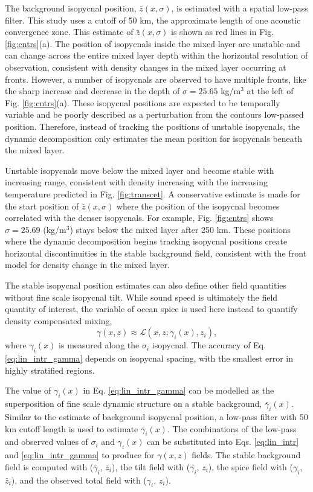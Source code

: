\documentclass[preprint,NumberedRefs]{JASA}
\begin{document}
The background isopycnal position, $\bar{z}(x, \sigma)$, is estimated with a spatial low-pass filter. This study uses a cutoff of 50 km, the approximate length of one acoustic convergence zone\cite{jensen2011computational}. This estimate of $\bar{z}(x, \sigma)$ is shown as red lines in Fig. \ref{fig:cntrs}(a). The position of isopycnals inside the mixed layer are unstable and can change across the entire mixed layer depth within the horizontal resolution of observation, consistent with density changes in the mixed layer occurring at fronts. However, a number of isopycnals are observed to have multiple fronts, like the sharp increase and decrease in the depth of $\sigma=25.65$ kg/m$^3$ at the left of Fig. \ref{fig:cntrs}(a). These isopycnal positions are expected to be temporally variable and be poorly described as a perturbation from the contours low-passed position. Therefore, instead of tracking the positions of unstable isopycnals, the dynamic decomposition only estimates the mean position for isopycnals beneath the mixed layer.

Unstable isopycnals move below the mixed layer and become stable with increasing range, consistent with density increasing with the increasing temperature predicted in Fig. \ref{fig:transcet}. A conservative estimate is made for the start position of $\bar{z}(x, \sigma)$ where the position of the isopycnal becomes correlated with the denser isopycnals. For example, Fig. \ref{fig:cntrs} shows $\sigma=25.69$ (kg/m$^3$) stays below the mixed layer after 250 km. These positions where the dynamic decomposition begins tracking isopycnal positions create horizontal discontinuities in the stable background field, consistent with the front model for density change in the mixed layer.

The stable isopycnal position estimates can also define other field quantities without fine scale isopycnal tilt. While sound speed is ultimately the field quantity of interest, the variable of ocean spice is used here instead to quantify density compensated mixing,
\begin{equation}
    \gamma(x, z)\approx\mathcal{L}(x, z; \gamma_i(x), z_i),
    \label{eq:lin_intr_gamma}
\end{equation}
where $\gamma_i(x)$ is measured along the $\sigma_i$ isopycnal. The accuracy of Eq. \eqref{eq:lin_intr_gamma} depends on isopycnal spacing, with the smallest error in highly stratified regions.

The value of $\gamma_i(x)$ in Eq. \eqref{eq:lin_intr_gamma} can be modelled as the superposition of fine scale dynamic structure on a stable background, $\bar{\gamma}_i(x)$. Similar to the estimate of background isopycnal position, a low-pass filter with 50 km cutoff length is used to estimate $\bar{\gamma}_i(x)$. The combinations of the low-pass and observed values of $\sigma_i$ and $\gamma_i(x)$ can be substituted into Eqs. \eqref{eq:lin_intr} and \eqref{eq:lin_intr_gamma} to produce for $\gamma(x,z)$ fields. The stable background field is computed with ($\bar{\gamma}_i$, $\bar{z}_i$), the tilt field with ($\bar{\gamma_i}$, $z_i$), the spice field with ($\gamma_i$, $\bar{z}_i$), and the observed total field with ($\gamma_i$, $z_i$).
\end{document}
